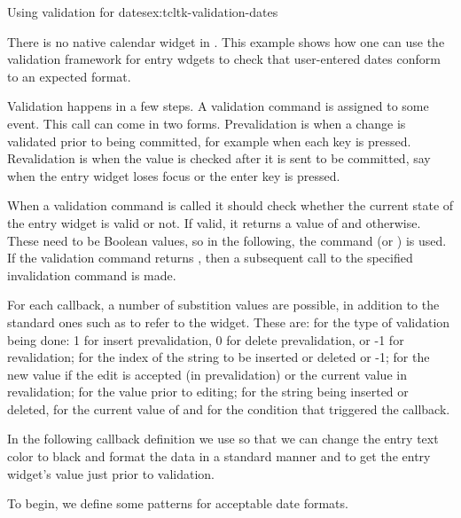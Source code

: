 \begin{example}{Using validation for dates}{ex:tcltk-validation-dates}



There is no native calendar widget in . This example shows how one can use the validation framework for entry wdgets to check that user-entered dates conform to an expected format. 

Validation happens in a few steps.  A validation command is assigned
to some event. This call can come in two forms. Prevalidation is when
a change is validated prior to being committed, for example when each key
is pressed.  Revalidation is when the value is checked
after it is sent to be committed, say when the entry widget loses
focus or the enter key is pressed.

When a validation command is called it should check
whether the current state of the entry widget is valid or not. If
valid, it returns a value of  and 
otherwise. These need to be \TCL\/ Boolean values, so in the following,
the command  (or ) is used. If
the validation command returns , then a subsequent call to
the specified invalidation command is made.

For each callback, a number of substition values are possible, in
addition to the standard ones such as  to refer to the
widget. These are:  for the type of validation being done: 1
for insert prevalidation, 0 for delete prevalidation, or -1 for
revalidation;  for the index of the string to be inserted or
deleted or -1;  for the new value if the edit is accepted (in
prevalidation) or the current value in revalidation;  for the
value prior to editing;  for the string being inserted or
deleted,  for the current value of  and
 for the condition that triggered the callback.

In the following callback definition we use  so that we can change the entry text color to black and format the data in a standard manner and  to get the entry widget's value just prior to validation.


To begin,  we define some patterns for acceptable date formats.
\begin{Schunk}
\end{Schunk}


\end{example}
